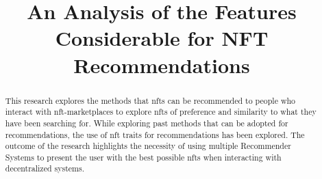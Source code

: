 \documentclass[conference]{IEEEtran}
\begin{document}
\title{An Analysis of the Features Considerable for NFT Recommendations\\
}

\author{
\and
{}
}

\maketitle

\begin{abstract}
This research explores the methods that \gls{nft}s can be recommended to people who interact with \gls{nft}-marketplaces to explore \gls{nft}s of preference and similarity to what they have been searching for. While exploring past methods that can be adopted for recommendations, the use of \gls{nft} traits for recommendations has been explored. The outcome of the research highlights the necessity of using multiple Recommender Systems to present the user with the best possible \gls{nft}s when interacting with decentralized systems.
\end{abstract}
\end{document}
